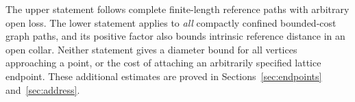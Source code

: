 \begin{remark}\label{metric:no-endpoint-control}
The upper statement follows complete finite-length reference paths with
arbitrary open loss. The lower statement applies to \emph{all} compactly
confined bounded-cost graph paths, and its positive factor also bounds
intrinsic reference distance in an open collar. Neither statement gives
a diameter bound for all vertices approaching a point, or the cost of
attaching an arbitrarily specified lattice endpoint. These additional
estimates are proved in Sections~\ref{sec:endpoints} and~\ref{sec:address}.
\end{remark}
